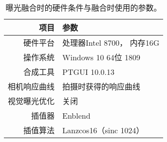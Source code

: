 \begin{table}[htbp]
    \centering
    \begin{tabular}{r|l}
        \toprule
        项目 & 参数\\
        \hline
        硬件平台 & 处理器Intel 8700， 内存16G\\
        操作系统 & Windows 10 64位 1809\\
        合成工具 & PTGUI \cite{ptgui} 10.0.13\\
        \hline
        相机响应曲线  & 拍摄时获得的响应曲线\\
        视觉曝光优化  & 关闭\\
        插值器       & Enblend \\
        插值算法 &  Lanzcos16（sinc 1024）\\
        \bottomrule    
    \end{tabular}
    \caption[曝光融合参数列表]{
        \label{table:fusion-config}
        曝光融合时的硬件条件与融合时使用的参数。
    }
\end{table}